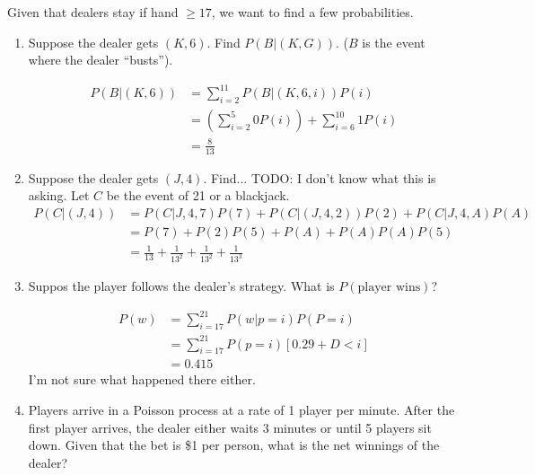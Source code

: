                     Given that dealers stay if hand $\ge 17$, we want to find a few probabilities.
                    \begin{enumerate}
                        \item Suppose the dealer gets $(K, 6)$. Find $P(B |(K, G))$. ($B$ is the event where the dealer ``busts'').

                            \begin{align*}
                                P(B | (K, 6)) &= \sum_{i=2}^{11} P(B | (K, 6, i)) P(i) \\
                                &= \left(\sum_{i=2}^{5} 0 P(i) \right) + \sum_{i=6}^{10} 1 P(i) \\
                                &= \frac{8}{13}
                            \end{align*}
                        \item Suppose the dealer gets $(J, 4)$. Find... TODO: I don't know what this is asking.
                            Let $C$ be the event of 21 or a blackjack.
                            \begin{align*}
                                P(C | (J, 4)) &= P(C | J, 4, 7) P(7) + P(C | (J, 4, 2)) P(2) + P(C | J, 4, A)P(A) \\
                                &= P(7) + P(2)P(5) + P(A) + P(A)P(A)P(5) \\
                                &= \frac{1}{13} + \frac{1}{13^2} + \frac{1}{13^2} + \frac{1}{13^3}
                            \end{align*}
                        \item Suppos the player follows the dealer's strategy.
                            What is $P(\text{player wins})$?

                            \begin{align*}
                                P(w) &= \sum_{i = 17}^{21} P(w | p = i) P(P = i) \\
                                     &= \sum_{i = 17}^{21} P(p = i) [0.29 + D < i] \\
                                     &= 0.415
                            \end{align*}
                            I'm not sure what happened there either.

                        \item Players arrive in a Poisson process at a rate of 1 player per minute.
                              After the first player arrives, the dealer either waits 3 minutes or until 5 players sit down.
                              Given that the bet is \$1 per person, what is the net winnings of the dealer?

                    \end{enumerate}
